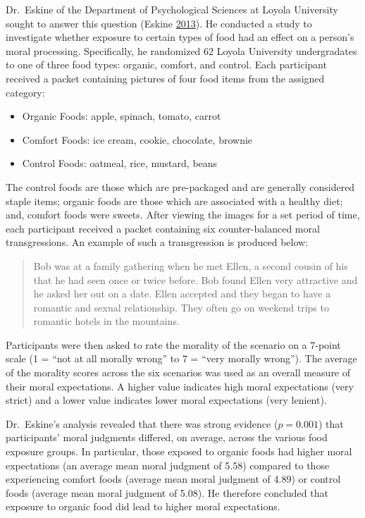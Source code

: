 \documentclass[]{book}
\providecommand{\tightlist}{%
  \setlength{\itemsep}{0pt}\setlength{\parskip}{0pt}}
\theoremstyle{definition}
\theoremstyle{definition}
\theoremstyle{definition}
\theoremstyle{remark}
\begin{document}
Dr.~Eskine of the Department of Psychological Sciences at Loyola
University sought to answer this question (Eskine
\protect\hyperlink{ref-Eskine2013}{2013}). He conducted a study to
investigate whether exposure to certain types of food had an effect on a
person's moral processing. Specifically, he randomized 62 Loyola
University undergradates to one of three food types: organic, comfort,
and control. Each participant received a packet containing pictures of
four food items from the assigned category:

\begin{itemize}
\tightlist
\item
  Organic Foods: apple, spinach, tomato, carrot
\item
  Comfort Foods: ice cream, cookie, chocolate, brownie
\item
  Control Foods: oatmeal, rice, mustard, beans
\end{itemize}

The control foods are those which are pre-packaged and are generally
considered staple items; organic foods are those which are associated
with a healthy diet; and, comfort foods were sweets. After viewing the
images for a set period of time, each participant received a packet
containing six counter-balanced moral transgressions. An example of such
a transgression is produced below:

\begin{quote}
Bob was at a family gathering when he met Ellen, a second cousin of his
that he had seen once or twice before. Bob found Ellen very attractive
and he asked her out on a date. Ellen accepted and they began to have a
romantic and sexual relationship. They often go on weekend trips to
romantic hotels in the mountains.
\end{quote}

Participants were then asked to rate the morality of the scenario on a
7-point scale (1 = ``not at all morally wrong'' to 7 = ``very morally
wrong''). The average of the morality scores across the six scenarios
was used as an overall measure of their moral expectations. A higher
value indicates high moral expectations (very strict) and a lower value
indicates lower moral expectations (very lenient).

Dr.~Eskine's analysis revealed that there was strong evidence
(\(p = 0.001\)) that participants' moral judgments differed, on average,
across the various food exposure groups. In particular, those exposed to
organic foods had higher moral expectations (an average mean moral
judgment of 5.58) compared to those experiencing comfort foods (average
mean moral judgment of 4.89) or control foods (average mean moral
judgment of 5.08). He therefore concluded that exposure to organic food
did lead to higher moral expectations.
\end{document}
